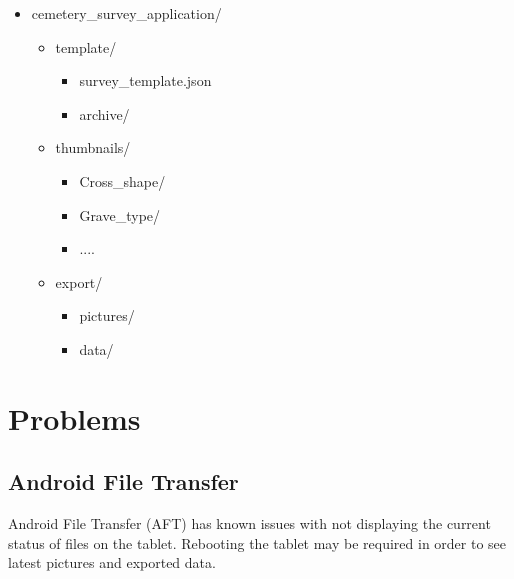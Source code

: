 \documentclass{scrreprt}
\begin{document}
\begin{itemize}
\renewcommand{\labelitemi}{\textbf{}}
\renewcommand{\labelitemii}{\textbf{}}
\renewcommand{\labelitemiii}{\textbf{}}
	\item cemetery_survey_application/
	\begin{itemize}
		\item template/
		\begin{itemize}
			\item survey_template.json
			\item archive/
		\end{itemize}
		\item thumbnails/
		\begin{itemize}
			\item Cross_shape/
			\item Grave_type/
			\item ....
		\end{itemize}
		\item export/
		\begin{itemize}
			\item pictures/
			\item data/
		\end{itemize}
	\end{itemize}
\end{itemize}

\chapter{Problems}
\section{Android File Transfer}
\label{atf}
Android File Transfer (AFT) has known issues with not displaying the current status of files on the tablet. Rebooting the tablet may be required in order to see latest pictures and exported data.
\end{document}

